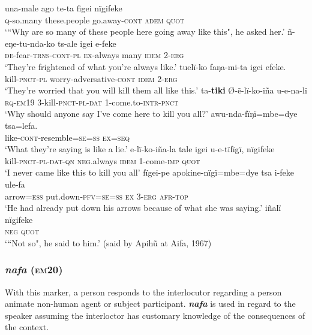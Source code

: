 \documentclass[output=paper]{langsci/langscibook}
\begin{document}
\begin{exe}
\ex \label{ex:eb45}
	\begin{xlist}
	\ex \label{ex:eb45a}
	\gll una-male ago te-ta figei nïgifeke\\
	\textsc{q}-so.many these.people go.away-\textsc{cont} \textsc{adem} \textsc{quot}\\
	\trans ‘“Why are so many of these people here going away like this", he asked her.'
	\ex \label{ex:eb45b}
	\gll ñ-eŋe-tu-nda-ko ts-ale igei e-feke\\
	\textsc{de}-fear-\textsc{trns-cont-pl} \textsc{ex}-always many \textsc{idem} 2-\textsc{erg}\\
	\trans ‘They’re frightened of what you’re always like.’
	\ex\label{ex:eb45c}
	\gll tuelï-ko faŋa-mi-ta igei efeke.\\
	kill-\textsc{pnct-pl} worry-adversative-\textsc{cont} \textsc{idem} 2-\textsc{erg}\\
	\trans ‘They’re worried that you will kill them all like this.’
	\ex \label{ex:eb45d}
	\gll ta-\textbf{tiki} Ø-ẽ-lï-ko-iña u-e-na-lï\\
	\textsc{rq-em19} 3-kill-\textsc{pnct-pl-dat} 1-come.to-\textsc{intr-pnct}\\
	\trans ‘Why should anyone say I’ve come here to kill you all?’
	\ex \label{ex:eb45e}
	\gll awu-nda-fïŋï=mbe=dye tsa=lefa.\\
	like-\textsc{cont}-resemble=\textsc{se=ss} \textsc{ex=seq}\\
	\trans ‘What they’re saying is like a lie.’
	\ex \label{ex:eb45f}
	\gll e-lï-ko-iña-la tale igei u-e-tïfïgï, nïgifeke\\
	kill-\textsc{pnct-pl-dat-qn} \textsc{neg}.always \textsc{idem} 1-come-\textsc{imp} \textsc{quot}\\
	\trans ‘I never came like this to kill you all’
	\ex \label{ex:eb45g}
	\gll fïgei-pe apokine-nïgï=mbe=dye tsa i-feke ule-fa\\
	arrow=\textsc{ess} put.down-\textsc{pfv=se=ss} \textsc{ex} 3-\textsc{erg} \textsc{afr-top}\\
	\trans ‘He had already put down his arrows because of what she was saying.’
	\ex \label{ex:eb45h}
	\gll iñalï nïgifeke\\
	\textsc{neg} \textsc{quot}\\
	\trans ‘“Not so", he said to him.' (said by Apihũ at Aifa, 1967)
\end{xlist}
\end{exe}

\subsubsection{\textit{nafa} (\textsc{em}20)} 
With this marker, a  person responds to the interlocutor regarding  a  person animate non-human agent or subject participant.   \textbf{\textit{nafa}} is used in regard to the speaker  assuming the interloctor has customary knowledge of the consequences of the context. 
\end{document}

